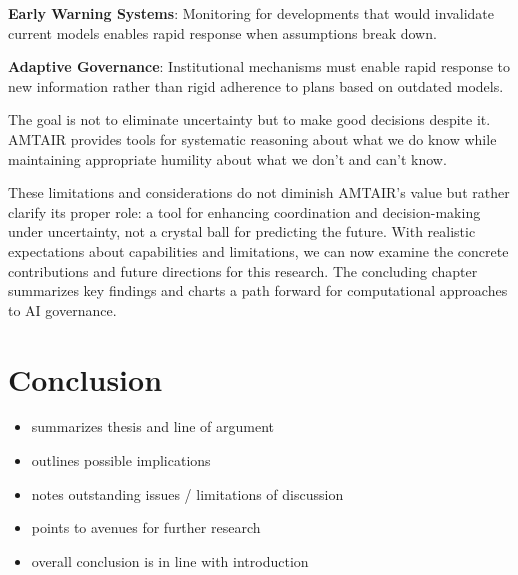 \documentclass[
  11pt,
  letterpaper,
]{book}
\providecommand{\tightlist}{%
  \setlength{\itemsep}{0pt}\setlength{\parskip}{0pt}}
\begin{document}
\textbf{Early Warning Systems}: Monitoring for developments that would
invalidate current models enables rapid response when assumptions break
down.

\textbf{Adaptive Governance}: Institutional mechanisms must enable rapid
response to new information rather than rigid adherence to plans based
on outdated models.

The goal is not to eliminate uncertainty but to make good decisions
despite it. AMTAIR provides tools for systematic reasoning about what we
do know while maintaining appropriate humility about what we don't and
can't know.

These limitations and considerations do not diminish AMTAIR's value but
rather clarify its proper role: a tool for enhancing coordination and
decision-making under uncertainty, not a crystal ball for predicting the
future. With realistic expectations about capabilities and limitations,
we can now examine the concrete contributions and future directions for
this research. The concluding chapter summarizes key findings and charts
a path forward for computational approaches to AI governance.


\chapter{Conclusion}\label{sec-conclusion}

\begin{tcolorbox}[enhanced jigsaw, bottomrule=.15mm, title=\textcolor{quarto-callout-note-color}{\faInfo}\hspace{0.5em}{10\% of Grade: \textasciitilde{} 14\% of text \textasciitilde{} 4200
words \textasciitilde{} 10 pages}, opacityback=0, arc=.35mm, breakable, toptitle=1mm, toprule=.15mm, colframe=quarto-callout-note-color-frame, bottomtitle=1mm, rightrule=.15mm, opacitybacktitle=0.6, left=2mm, titlerule=0mm, leftrule=.75mm, colback=white, colbacktitle=quarto-callout-note-color!10!white, coltitle=black]

\begin{itemize}
\tightlist
\item
  summarizes thesis and line of argument
\item
  outlines possible implications
\item
  notes outstanding issues / limitations of discussion
\item
  points to avenues for further research
\item
  overall conclusion is in line with introduction
\end{itemize}

\end{tcolorbox}
\end{document}
